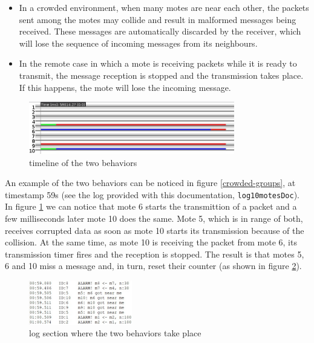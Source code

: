 \documentclass[11pt]{article}
\begin{document}
\begin{itemize}
  \item In a crowded environment, when many motes are near each other, the packets sent among the motes may collide and result in malformed messages being received. These messages are automatically discarded by the receiver, which will lose the sequence of incoming messages from its neighbours.
  \item In the remote case in which a mote is receiving packets while it is ready to transmit, the message reception is stopped and the transmission takes place. If this happens, the mote will lose the incoming message.
\end{itemize}

\begin{figure}[H]
  \centering
  \includegraphics[width=0.8\textwidth]{10-motes-timeline.jpg}
  \caption{timeline of the two behaviors}
  \label{timeline}
\end{figure}

An example of the two behaviors can be noticed in figure \ref{crowded-groups}, at timestamp 59s (see the log provided with this documentation, \texttt{log10motesDoc}). In figure \ref{timeline} we can notice that mote 6 starts the transmittion of a packet and a few milliseconds later mote 10 does the same. Mote 5, which is in range of both, receives corrupted data as soon as mote 10 starts its transmission because of the collision. \newline
At the same time, as mote 10 is receiving the packet from mote 6, its transmission timer fires and the reception is stopped. \newline
The result is that motes 5, 6 and 10 miss a message and, in turn, reset their counter (as shown in figure \ref{log}).

\begin{figure}[H]
  \centering
  \includegraphics[width=0.40\textwidth]{LogTimeline.jpg}
  \caption{log section where the two behaviors take place}
  \label{log}  
\end{figure}
\end{document}
